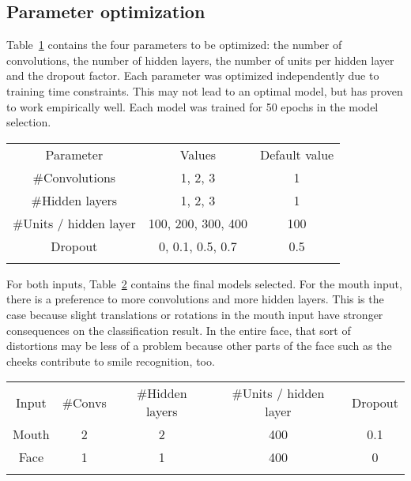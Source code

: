\documentclass{ws-procs9x6}
\begin{document}
\subsection{Parameter optimization}
\label{chapter:param}
Table~\ref{table:cv_values} contains the four parameters to be optimized: the number of convolutions, the number of hidden layers, the number of units per hidden layer and the dropout factor. Each parameter was optimized independently due to training time constraints. This may not lead to an optimal model, but has proven to work empirically well. Each model was trained for 50 epochs in the model selection.

\begin{table}[h!]
{\begin{tabular}{@{}ccc@{}}\toprule
Parameter & Values & Default value \\
\colrule
\#Convolutions & 1, 2, 3 & 1 \\
\#Hidden layers& 1, 2, 3 & 1 \\
\#Units / hidden layer & 100, 200, 300, 400 & 100 \\
Dropout & 0, 0.1, 0.5, 0.7 & 0.5 \\\botrule
\end{tabular}}
\label{table:cv_values}
\end{table}

For both inputs, Table~\ref{table:cv_both_final_models_full} contains the final models selected. For the mouth input, there is a preference to more convolutions and more hidden layers. This is the case because slight translations or rotations in the mouth input have stronger consequences on the classification result. In the entire face, that sort of distortions may be less of a problem because other parts of the face such as the cheeks contribute to smile recognition, too.

\begin{table}[h!]
{\begin{tabular}{@{}ccccc@{}}\toprule
Input & \#Convs & \#Hidden layers & \#Units / hidden layer & Dropout \\
\colrule
Mouth & 2 & 2 & 400 & 0.1 \\
Face & 1 & 1 & 400 & 0 \\\botrule
\end{tabular}}
\label{table:cv_both_final_models_full}
\end{table}
\end{document}
